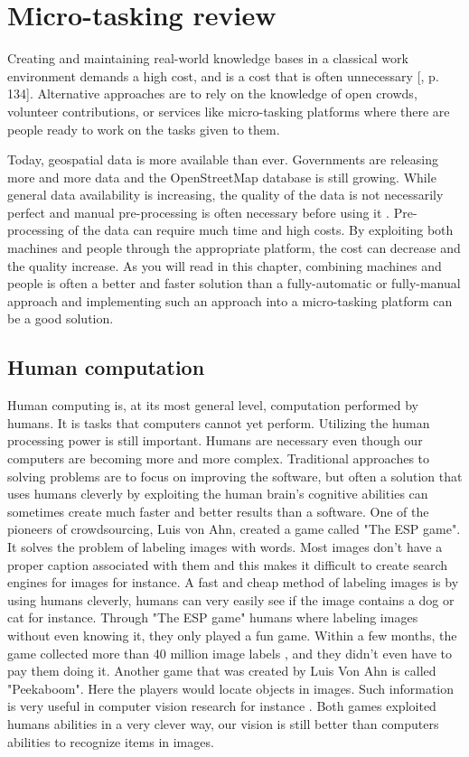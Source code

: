 \chapter{Micro-tasking review}

Creating and maintaining real-world knowledge bases in a classical work environment demands a high cost, and is a cost that is often unnecessary [\citep{Meier2013}, p. 134]. Alternative approaches are to rely on the knowledge of open crowds, volunteer contributions, or services like micro-tasking platforms where there are people ready to work on the tasks given to them.   

Today, geospatial data is more available than ever. Governments are releasing more and more data and the OpenStreetMap database is still growing. While general data availability is increasing, the quality of the data is not necessarily perfect and manual pre-processing is often necessary before using it \citep{Difallah2015}.  Pre-processing of the data can require much time and high costs. By exploiting both machines and people through the appropriate platform, the cost can decrease and the quality increase. As you will read in this chapter, combining machines and people is often a better and faster solution than a fully-automatic or fully-manual approach and implementing such an approach into a micro-tasking platform can be a good solution. 

\section{Human computation}\label{sec:humancomputation}
Human computing is, at its most general level, computation performed by humans. It is tasks that computers cannot yet perform. Utilizing the human processing power is still important. Humans are necessary even though our computers are becoming more and more complex. Traditional approaches to solving problems are to focus on improving the software, but often a solution that uses humans cleverly by exploiting the human brain's cognitive abilities can sometimes create much faster and better results than a software. One of the pioneers of crowdsourcing, Luis von Ahn, created a game called "The ESP game". It solves the problem of labeling images with words. Most images don't have a proper caption associated with them and this makes it difficult to create search engines for images for instance. A fast and cheap method of labeling images is by using humans cleverly, humans can very easily see if the image contains a dog or cat for instance. Through "The ESP game" humans where labeling images without even knowing it, they only played a fun game. Within a few months, the game collected more than 40 million image labels \citep{VonAhn2008}, and they didn't even have to pay them doing it. Another game that was created by Luis Von Ahn is called "Peekaboom". Here the players would locate objects in images. Such information is very useful in computer vision research for instance \citep{VonAhn2008}. Both games exploited humans abilities in a very clever way, our vision is still better than computers abilities to recognize items in images. 

